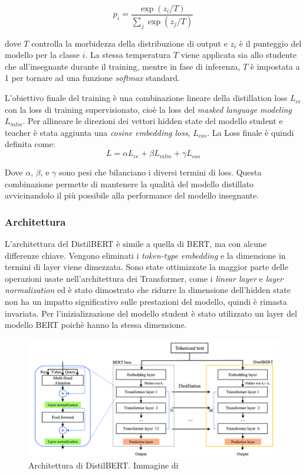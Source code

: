 \documentclass[../../Thesis.tex]{subfiles}
\begin{document}
$$
p_i = \frac{\exp(z_i / T)}{\sum_j \exp(z_j / T)}
$$

dove $T$ controlla la morbidezza della distribuzione di output e $z_i$ \`e il punteggio del modello per la classe $i$. La stessa temperatura $T$ viene applicata sia allo studente che all'insegnante durante il training, mentre in fase di inferenza, $T$ \`e impostata a 1 per tornare ad una funzione \textit{softmax} standard.

L'obiettivo finale del training \`e una combinazione lineare della distillation loss $L_{ce}$ con la loss di  training supervisionato, cio\`e la loss del \textit{masked language modeling} $L_{mlm}$. Per allineare le direzioni dei vettori hidden state del modello student e teacher \`e stata aggiunta una  \textit{cosine embedding loss}, $L_{cos}$. La Loss finale \`e quindi definita come:
$$
L = \alpha L_{ce} + \beta L_{mlm} + \gamma L_{cos}
$$

Dove $\alpha$, $\beta$, e $\gamma$ sono pesi che bilanciano i diversi termini di loss. Questa combinazione permette di mantenere la qualit\`a del modello distillato avvicinandolo il pi\`u possibile alla performance del modello insegnante.

\subsubsection{Architettura}
L'architettura del DistilBERT \`e simile a quella di BERT, ma con alcune differenze chiave. Vengono eliminati i \emph{token-type embedding} e la dimensione in termini di layer viene dimezzata. Sono state ottimizzate la maggior parte delle operazioni usate nell'architettura dei Transformer, come i \emph{linear layer} e \emph{layer normalization} ed \`e stato dimostrato che ridurre la dimensione dell'hidden state non ha un impatto significativo sulle prestazioni del modello, quindi \`e rimasta invariata. Per l'inizializzazione del modello student \`e stato utilizzato un layer del modello BERT poich\`e hanno la stessa dimensione. 

\begin{figure}
    \centering
    \includegraphics[width=\textwidth]{../../img/DistilBERT-Architecture.png}
    \caption{Architettura di DistilBERT. Immagine di \cite{DistilbertImage}}
    \label{fig:distilbert}
\end{figure}
\end{document}
